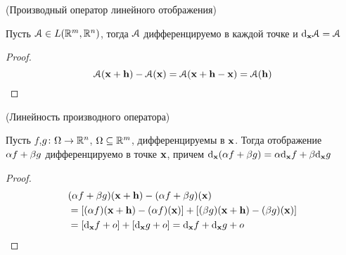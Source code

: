 \begin{proposition}(Производный оператор линейного отображения)

    Пусть $\cA \in L(\Rm, \Rn)$, тогда $\cA$ дифференцируемо в каждой точке и
    $\der{\cA}{\x} = \cA$
\end{proposition}
\begin{proof}
\[
    \cA(\x + \h) - \cA(\x) = \cA(\x + \h - \x) = \cA(\h)
\]
\end{proof}

\begin{proposition}(Линейность производного оператора)

    Пусть $f\!$, $\!\!g \colon \O \to \Rn$, $\O \subseteq \Rm$, дифференцируемы в
    $\x$. Тогда отображение $\a f + \b g$ дифференцируемо в точке $\x$, причем
    $\der{(\a f + \b g)}{\x} = \a \der{f}{\x} + \b \der{g}{\x}$
\end{proposition}
\begin{proof}
\begin{align*}
    &(\a f + \b g)(\x + \h) - (\a f + \b g)(\x) \\
    &= [(\a f)(\x + \h) - (\a f)(\x)] + [(\b g)(\x + \h) - (\b g)(\x)] \\
    &= [\der{f}{\x} + o] + [\der{g}{\x} + o] = \der{f}{\x} + \der{g}{\x} + o
\end{align*}
\end{proof}

